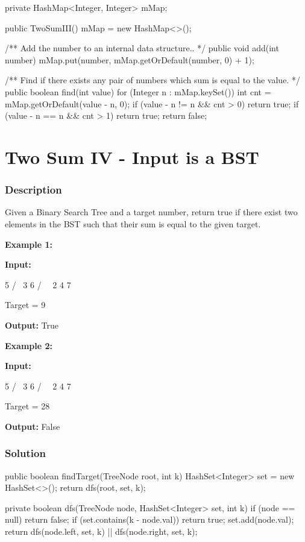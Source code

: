 \begin{Code}
private HashMap<Integer, Integer> mMap;

public TwoSumIII() {
    mMap = new HashMap<>();
}

/** Add the number to an internal data structure.. */
public void add(int number) {
    mMap.put(number, mMap.getOrDefault(number, 0) + 1);
}

/** Find if there exists any pair of numbers which sum is equal to the value. */
public boolean find(int value) {
    for (Integer n : mMap.keySet()) {
        int cnt = mMap.getOrDefault(value - n, 0);
        if (value - n != n && cnt > 0) {
            return true;
        }
        if (value - n == n && cnt > 1) {
            return true;
        }
    }
    return false;
}
\end{Code}

\newpage

\section{Two Sum IV - Input is a BST} %

\subsubsection{Description}
Given a Binary Search Tree and a target number, return true if there exist two elements in the BST such that their sum is equal to the given target.

\textbf{Example 1:}

\textbf{Input:}
\begin{Code}
    5
   / \
  3   6
 / \   \
2   4   7
\end{Code}

Target = 9

\textbf{Output:} True

\textbf{Example 2:}

\textbf{Input:}
\begin{Code}
    5
   / \
  3   6
 / \   \
2   4   7
\end{Code}

Target = 28

\textbf{Output:} False

\subsubsection{Solution}

\begin{Code}
public boolean findTarget(TreeNode root, int k) {
    HashSet<Integer> set = new HashSet<>();
    return dfs(root, set, k);
}

private boolean dfs(TreeNode node, HashSet<Integer> set, int k) {
    if (node == null) {
        return false;
    }
    if (set.contains(k - node.val)) {
        return true;
    }
    set.add(node.val);
    return dfs(node.left, set, k) || dfs(node.right, set, k);
}
\end{Code}

